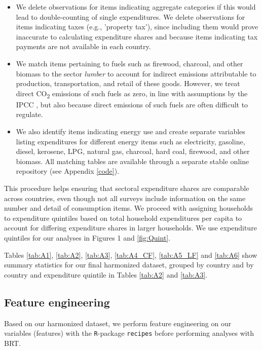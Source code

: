 \documentclass[12pt, a4paper]{article}
\begin{document}
\begin{refsection}
\begin{itemize}
    \item We delete observations for items indicating aggregate categories if this would lead to double-counting of single expenditures. We delete observations for items indicating taxes (e.g., 'property tax'), since including them would prove inaccurate to calculating expenditure shares and because items indicating tax payments are not available in each country.
    \item We match items pertaining to fuels such as firewood, charcoal, and other biomass to the sector \textit{lumber} to account for indirect emissions attributable to production, transportation, and retail of these goods. However, we treat direct CO\textsubscript{2} emissions of such fuels as zero, in line with assumptions by the IPCC \autocite{Grad.2023}, but also because direct emissions of such fuels are often difficult to regulate.
    \item We also identify items indicating energy use and create separate variables listing expenditures for different energy items such as electricity, gasoline, diesel, kerosene, LPG, natural gas, charcoal, hard coal, firewood, and other biomass. All matching tables are available through a separate stable online repository (see Appendix \ref{code}).
\end{itemize}

This procedure helps ensuring that sectoral expenditure shares are comparable across countries, even though not all surveys include information on the same number and detail of consumption items. We proceed with assigning households to expenditure quintiles based on total household expenditures per capita to account for differing expenditure shares in larger households. We use expenditure quintiles for our analyses in Figures 1 and \ref{fig:Quint}.

Tables \ref{tab:A1}, \ref{tab:A2}, \ref{tab:A3}, \ref{tab:A4_CF}, \ref{tab:A5_LF} and \ref{tab:A6} show summary statistics for our final harmonized dataset, grouped by country and by country and expenditure quintile in Tables \ref{tab:A2} and \ref{tab:A3}. 


\subsection{Feature engineering} \label{sec:featureengineering}

Based on our harmonized dataset, we perform feature engineering on our variables (features) with the \texttt{R}-package \texttt{recipes} before performing analyses with BRT.


\end{refsection}
\end{document}

